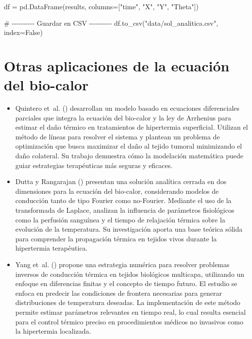 \documentclass[
  spanish,
  us-letterpaper,
]{scrreprt}
\newenvironment{Shaded}{\begin{snugshade}}{\end{snugshade}}
\newcommand{\CommentTok}[1]{\textcolor[rgb]{0.37,0.37,0.37}{#1}}
\newcommand{\NormalTok}[1]{\textcolor[rgb]{0.00,0.23,0.31}{#1}}
\newcommand{\OperatorTok}[1]{\textcolor[rgb]{0.37,0.37,0.37}{#1}}
\newcommand{\StringTok}[1]{\textcolor[rgb]{0.13,0.47,0.30}{#1}}
\newcommand{\VariableTok}[1]{\textcolor[rgb]{0.07,0.07,0.07}{#1}}
\theoremstyle{definition}
\theoremstyle{plain}
\theoremstyle{remark}
\begin{document}
\begin{Shaded}
\begin{Highlighting}[]
\NormalTok{df }\OperatorTok{=}\NormalTok{ pd.DataFrame(results, columns}\OperatorTok{=}\NormalTok{[}\StringTok{"time"}\NormalTok{, }\StringTok{"X"}\NormalTok{, }\StringTok{"Y"}\NormalTok{, }\StringTok{"Theta"}\NormalTok{])}

\CommentTok{\# {-}{-}{-}{-}{-}{-}{-}{-}{-}{-} Guardar en CSV {-}{-}{-}{-}{-}{-}{-}{-}{-}{-}}
\NormalTok{df.to\_csv(}\StringTok{"data/sol\_analitica.csv"}\NormalTok{, index}\OperatorTok{=}\VariableTok{False}\NormalTok{)}
\end{Highlighting}
\end{Shaded}

\chapter{Otras aplicaciones de la ecuación del
bio-calor}\label{otras-aplicaciones-de-la-ecuaciuxf3n-del-bio-calor}

\begin{itemize}
\item
  Quintero et~al. () desarrollan un
  modelo basado en ecuaciones diferenciales parciales que integra la
  ecuación del bio-calor y la ley de Arrhenius para estimar el daño
  térmico en tratamientos de hipertermia superficial. Utilizan el método
  de líneas para resolver el sistema y plantean un problema de
  optimización que busca maximizar el daño al tejido tumoral minimizando
  el daño colateral. Su trabajo demuestra cómo la modelación matemática
  puede guiar estrategias terapéuticas más seguras y eficaces.
\item
  Dutta y Rangarajan () presentan una
  solución analítica cerrada en dos dimensiones para la ecuación del
  bio-calor, considerando modelos de conducción tanto de tipo Fourier
  como no-Fourier. Mediante el uso de la transformada de Laplace,
  analizan la influencia de parámetros fisiológicos como la perfusión
  sanguínea y el tiempo de relajación térmica sobre la evolución de la
  temperatura. Su investigación aporta una base teórica sólida para
  comprender la propagación térmica en tejidos vivos durante la
  hipertermia terapéutica.
\item
  Yang et~al. () propone una estrategia
  numérica para resolver problemas inversos de conducción térmica en
  tejidos biológicos multicapa, utilizando un enfoque en diferencias
  finitas y el concepto de tiempo futuro. El estudio se enfoca en
  predecir las condiciones de frontera necesarias para generar
  distribuciones de temperatura deseadas. La implementación de este
  método permite estimar parámetros relevantes en tiempo real, lo cual
  resulta esencial para el control térmico preciso en procedimientos
  médicos no invasivos como la hipertermia localizada.
\end{itemize}
\end{document}

